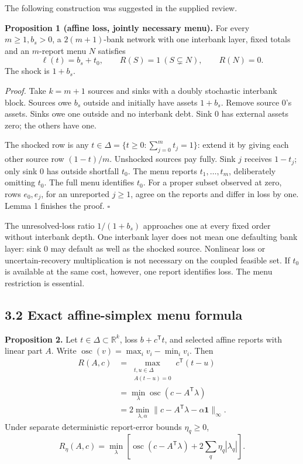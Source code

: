 \documentclass[
  british,
  11pt,
  a4paper,
]{article}
\begin{document}
The following construction was suggested in the supplied review.

\textbf{Proposition 1 (affine loss, jointly necessary menu).} For every
\(m\ge1,b_s>0\), a \(2(m+1)\)-bank network with one interbank layer,
fixed totals and an \(m\)-report menu \(N\) satisfies \[
\ell(t)=b_s+t_0,\qquad R(S)=1\ (S\subsetneq N),\qquad R(N)=0.
\tag{7}
\] The shock is \(1+b_s\).

\emph{Proof.} Take \(k=m+1\) sources and sinks with a doubly stochastic
interbank block. Sources owe \(b_s\) outside and initially have assets
\(1+b_s\). Remove source 0's assets. Sinks owe one outside and no
interbank debt. Sink 0 has external assets zero; the others have one.

The shocked row is any \(t\in\Delta=\{t\ge0:\sum_{j=0}^m t_j=1\}\):
extend it by giving each other source row \((1-t)/m\). Unshocked sources
pay fully. Sink \(j\) receives \(1-t_j\); only sink 0 has outside
shortfall \(t_0\). The menu reports \(t_1,\ldots,t_m\), deliberately
omitting \(t_0\). The full menu identifies \(t_0\). For a proper subset
observed at zero, rows \(e_0,e_j\), for an unreported \(j\ge1\), agree
on the reports and differ in loss by one. Lemma 1 finishes the proof.
\(\square\)

The unresolved-loss ratio \(1/(1+b_s)\) approaches one at every fixed
order without interbank depth. One interbank layer does not mean one
defaulting bank layer: sink 0 may default as well as the shocked source.
Nonlinear loss or uncertain-recovery multiplication is not necessary on
the coupled feasible set. If \(t_0\) is available at the same cost,
however, one report identifies loss. The menu restriction is essential.

\subsection{3.2 Exact affine-simplex menu
formula}\label{exact-affine-simplex-menu-formula}

\textbf{Proposition 2.} Let \(t\in\Delta\subset\mathbb R^k\), loss
\(b+c^\mathsf Tt\), and selected affine reports with linear part \(A\).
Write \(\operatorname{osc}(v)=\max_i v_i-\min_i v_i\). Then \[
\begin{split}
R(A,c)&=\max_{\substack{t,u\in\Delta\\A(t-u)=0}}c^\mathsf T(t-u)\\
&=\min_\lambda\operatorname{osc}(c-A^\mathsf T\lambda)\\
&=2\min_{\lambda,\alpha}\|c-A^\mathsf T\lambda-\alpha\mathbf1\|_\infty .
\end{split}
\tag{8}
\] Under separate deterministic report-error bounds \(\eta_q\ge0\), \[
R_\eta(A,c)=\min_\lambda\left[
\operatorname{osc}(c-A^\mathsf T\lambda)+2\sum_q\eta_q|\lambda_q|
\right].
\tag{9}
\]
\end{document}
